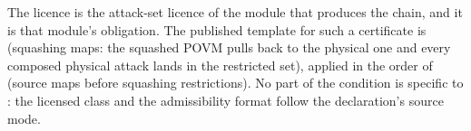 
The licence is the attack-set licence of the module that produces the chain,
and it is that module's obligation. The published template for such a
certificate is \cite[Lemma~9.3, Eqs.~(146)--(147)]{tupkary2026decoy}
(squashing maps: the squashed POVM pulls back to the physical one and every
composed physical attack lands in the restricted set), applied in the order of
\cite[Rem.~9.2]{tupkary2026decoy} (source maps before squashing
restrictions). No part of the condition is specific to :
the licensed class and the admissibility format follow the declaration's
source mode.

